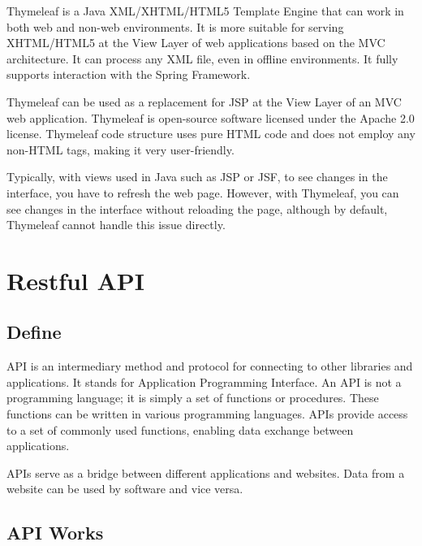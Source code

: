 \documentclass[../Main.tex]{subfiles}
\begin{document}
Thymeleaf is a Java XML/XHTML/HTML5 Template Engine that can work in both web and non-web environments.
It is more suitable for serving XHTML/HTML5 at the View Layer of web applications based on the MVC architecture.
It can process any XML file, even in offline environments.
It fully supports interaction with the Spring Framework.

Thymeleaf can be used as a replacement for JSP at the View Layer of an MVC web application.
Thymeleaf is open-source software licensed under the Apache 2.0 license.
Thymeleaf code structure uses pure HTML code and does not employ any non-HTML tags, making it very user-friendly.

Typically, with views used in Java such as JSP or JSF, to see changes in the interface, you have to refresh the web page.
However, with Thymeleaf, you can see changes in the interface without reloading the page, although by default, Thymeleaf cannot handle this issue directly.

\section{Restful API}

\subsection{Define}

API is an intermediary method and protocol for connecting to other libraries and applications.
It stands for Application Programming Interface.
An API is not a programming language; it is simply a set of functions or procedures.
These functions can be written in various programming languages.
APIs provide access to a set of commonly used functions, enabling data exchange between applications.

APIs serve as a bridge between different applications and websites.
Data from a website can be used by software and vice versa.

\subsection{API Works}
\end{document}

